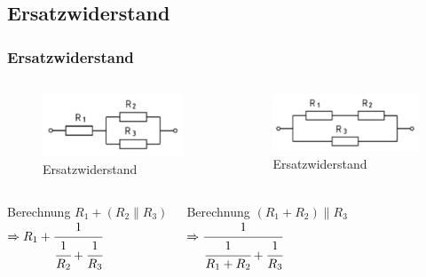 \subsection{Ersatzwiderstand}
\begin{frame}
  \frametitle{Ersatzwiderstand}
  \begin{columns}
    \begin{figure}
      \includegraphics[width=1\textwidth,height=.2\textheight,keepaspectratio]{e04/Ersatzwiderstand1.png}
      \caption{Ersatzwiderstand}
    \end{figure}
    \begin{figure}
      \includegraphics[width=1\textwidth,height=.2\textheight,keepaspectratio]{e04/Ersatzwiderstand2.png}
      \caption{Ersatzwiderstand}
    \end{figure}
  \end{columns}
  \begin{columns}
    \pause
    \begin{exampleblock}{Berechnung}
      $R_1 + (R_2 \parallel R_3)$ \\[1.5em]
      $\Rightarrow R_1 + \cfrac{1}{\cfrac{1}{R_2} + \cfrac{1}{R_3}}$
    \end{exampleblock}
    \pause
    \begin{exampleblock}{Berechnung}
      $(R_1 + R_2) \parallel R_3$\\[1.5em]
      $\Rightarrow \cfrac{1}{\cfrac{1}{R_1 + R_2} + \cfrac{1}{R_3}}$
    \end{exampleblock}
  \end{columns}
\end{frame}

